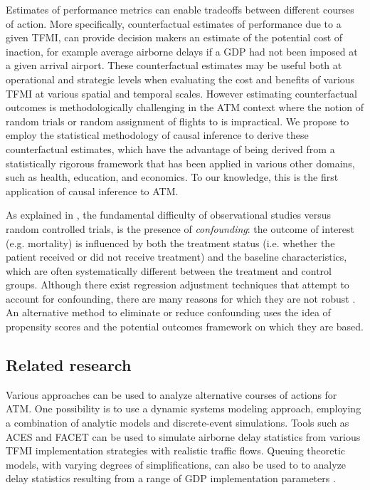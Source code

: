 \documentclass[conference]{IEEEtran}
\begin{document}
Estimates of performance metrics can enable tradeoffs between different courses of action.  More specifically, counterfactual estimates of performance due to a given TFMI,  can provide decision makers an estimate of the potential cost of inaction, for example average airborne delays if a GDP had not been imposed at a given arrival airport.  These counterfactual estimates may be useful both at operational and strategic levels when evaluating the cost and benefits of various TFMI at various spatial and temporal scales.  However estimating counterfactual outcomes is methodologically challenging in the ATM context where the notion of random trials or random assignment of flights to  is impractical.  We propose to employ the statistical methodology of causal inference to derive these counterfactual estimates, which have the advantage of being derived from a statistically rigorous framework that has been applied in various other domains, such as health, education, and economics.  To our knowledge, this is the first application of causal inference to ATM.  

As explained in \cite{austin2011introduction}, the fundamental difficulty of observational studies versus random controlled trials, is the presence of \emph{confounding}:  the outcome of interest (e.g. mortality) is influenced by both the treatment status (i.e. whether the patient received or did not receive treatment) and the baseline characteristics, which are often systematically different between the treatment and control groups.  Although there exist regression adjustment techniques that attempt to account for confounding, there are many reasons for which they are not robust \cite{austin2011introduction,austin2011tutorial,mccaffrey2013tutorial}.  An alternative method to eliminate or reduce confounding uses the idea of propensity scores and the potential outcomes framework on which they are based.

\subsection{Related research}
Various approaches can be used to analyze alternative courses of actions for ATM.  One possibility is to use a dynamic systems modeling approach, employing a combination of analytic models and discrete-event simulations.  Tools such as ACES and FACET \cite{facet} can be used to simulate airborne delay statistics from various TFMI implementation strategies with realistic traffic flows.  Queuing theoretic models, with varying degrees of simplifications, can also be used to to analyze delay statistics resulting from a range of GDP implementation parameters \cite{ball2001analysis,kim2009air,sengupta2010computational,gwiggner2014data, caccavale2014model}. 
\end{document}
